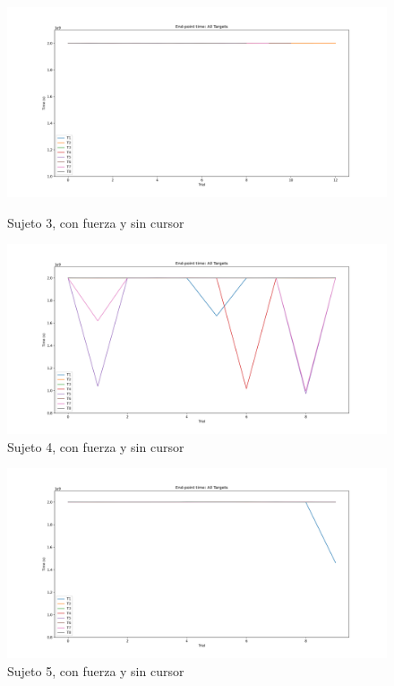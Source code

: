 \documentclass[a4paper,11pt, oneside]{book}
\begin{document}
\begin{figure}[H]
	\begin{minipage}[b]{0.5\linewidth}
		\centering
		\includegraphics[width=\linewidth]{sujeto3/force_no_cursor/evolution_time}
		\caption{Sujeto 3, con fuerza y sin cursor}
		\label{fig:figura1}
	\end{minipage}
	\hspace{0.5cm}
	\begin{minipage}[b]{0.5\linewidth}
		\centering
		\includegraphics[width=\linewidth]{sujeto4/force_no_cursor/evolution_time}
		\caption{Sujeto 4, con fuerza y sin cursor}
		\label{fig:figura2}
	\end{minipage}
\end{figure}
\begin{figure}[H]
	\begin{minipage}[b]{0.5\linewidth}
		\centering
		\includegraphics[width=\linewidth]{sujeto5/force_no_cursor/evolution_time}
		\caption{Sujeto 5, con fuerza y sin cursor}
		\label{fig:figura1}
	\end{minipage}
\end{figure}
\end{document}
